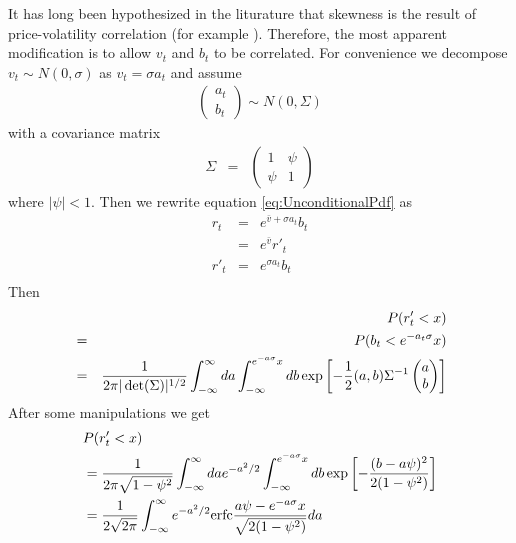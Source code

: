 \documentclass{book}
\begin{document}
It has long been hypothesized in the liturature that skewness is the
result of price-volatility correlation (for example
\cite{Potters2003}). Therefore, the most apparent modification is to
allow $v_t$ and $b_t$ to be correlated. For convenience we decompose
$v_t \sim N(0, \sigma)$ as $v_t = \sigma a_t$ and assume
\begin{eqnarray*}
  \begin{pmatrix}
    a_t \\
    b_t
  \end{pmatrix} \sim N(0, \Sigma)
\end{eqnarray*}
with a covariance matrix
\begin{eqnarray*}
    \Sigma &=&
  \begin{pmatrix}
    1 & \psi \\
    \psi & 1
  \end{pmatrix}
\end{eqnarray*}
where $|\psi| < 1$. Then we rewrite equation \ref{eq:UnconditionalPdf}
as
\begin{eqnarray*}
    r_t &=& e^{\bar{v} + \sigma a_t} b_t \\
    &=& e^{\bar{v}} r'_t \\
    r'_t &=& e^{\sigma a_t} b_t \\
\end{eqnarray*}
Then
\begin{eqnarray*}
  && P(r'_t < x)\\
  &=& P(b_t < e^{-a_t\sigma}x) \\
  &=& {1 \over 2\pi |\det(\Sigma)|^{1/2}}
  \int_{-\infty}^{\infty} da \int_{-\infty}^{e^{-a\sigma}x} db
  \exp\left[
    -{1 \over 2} (a, b) \Sigma^{-1}
    \begin{pmatrix}
      a \\
      b
    \end{pmatrix}
  \right] \\
\end{eqnarray*}
After some manipulations we get
\begin{equation}\label{eq:UncondCDFAsymmetric}
  \begin{aligned}
    & P(r'_t < x) \\  
    &= {1 \over 2\pi \sqrt{1 - \psi^2}} \int_{-\infty}^{\infty} da
    e^{-a^2/2} \int_{-\infty}^{e^{-a\sigma}x} db
    \exp\left[
      - {(b - a\psi)^2 \over 2(1 - \psi^2)}
    \right] \\
    &= {1 \over 2\sqrt{2\pi}} \int_{-\infty}^{\infty} e^{-a^2/2}
    \text{erfc}{a\psi - e^{-a\sigma} x \over \sqrt{2(1-\psi^2)}} da
  \end{aligned}
\end{equation}
\end{document}
